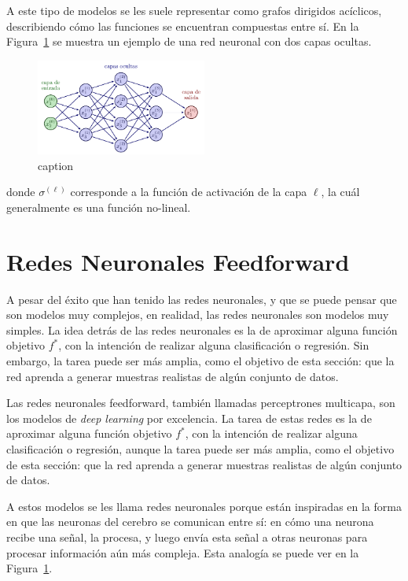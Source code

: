 {{A este tipo de modelos se les suele representar como grafos dirigidos acíclicos, describiendo cómo las funciones se encuentran compuestas entre sí. En la Figura~\ref{fig:ejemplo-red-neuronal} se muestra un ejemplo de una red neuronal con dos capas ocultas.

\begin{figure}[htbp]
    \centering
    \includegraphics[width=0.5\textwidth]{img/neural_network/neural_network_feed_forward.pdf}
    \caption{caption}
    \label{fig:ejemplo-red-neuronal}
\end{figure}


donde $\sigma^{(\ell)}$ corresponde a la función de activación de la capa $\ell$, la cuál generalmente es una función no-lineal.

\section{Redes Neuronales Feedforward}\label{sec:redes-neuronales-feedforward}
{
    A pesar del éxito que han tenido las redes neuronales, y que se puede pensar que son modelos muy complejos, en realidad, las redes neuronales son modelos muy simples. La idea detrás de las redes neuronales es la de aproximar alguna función objetivo $f^\ast$, con la intención de realizar alguna clasificación o regresión. Sin embargo, la tarea puede ser más amplia, como el objetivo de esta sección: que la red aprenda a generar muestras realistas de algún conjunto de datos.


}



Las redes neuronales feedforward, también llamadas perceptrones multicapa, son los modelos de \textit{deep learning} por excelencia. La tarea de estas redes es la de aproximar alguna función objetivo $f^\ast$, con la intención de realizar alguna clasificación o regresión, aunque la tarea puede ser más amplia, como el objetivo de esta sección: que la red aprenda a generar muestras realistas de algún conjunto de datos.

A estos modelos se les llama redes neuronales porque están inspiradas en la forma en que las neuronas del cerebro se comunican entre sí: en cómo una neurona recibe una señal, la procesa, y luego envía esta señal a otras neuronas para procesar información aún más compleja. Esta analogía se puede ver en la Figura~\ref{fig:ejemplo-red-neuronal}.

}}
